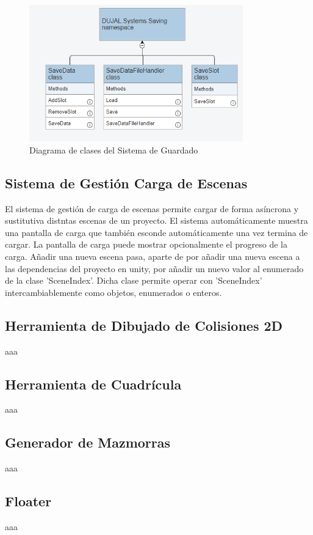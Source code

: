 \begin{figure}[H]
  \centering
    \includegraphics[width=350px,clip=true]{Saving.png}
  \caption{Diagrama de clases del Sistema de Guardado}
  \label{fig:savinguml}
\end{figure}

\subsection{Sistema de Gestión Carga de Escenas}
El sistema de gestión de carga de escenas permite cargar de forma asíncrona y sustitutiva distntas escenas de un proyecto. El sistema automáticamente muestra una 
pantalla de carga que también esconde automáticamente una vez termina de cargar. La pantalla de carga puede mostrar opcionalmente el progreso de la carga. Añadir una nueva
 escena pasa, aparte de por añadir una nueva escena a las dependencias del proyecto en unity, por añadir un nuevo valor al enumerado de la clase 'SceneIndex'. Dicha clase 
 permite operar con 'SceneIndex' intercambiablemente como objetos, enumerados o enteros.

\subsection{Herramienta de Dibujado de Colisiones 2D}
aaa

\subsection{Herramienta de Cuadrícula}
aaa

\subsection{Generador de Mazmorras}
aaa

\subsection{Floater}
aaa

